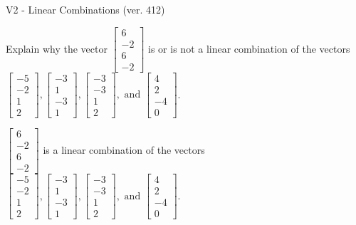 \begin{exercise}
  \begin{exerciseTitle}V2 - Linear Combinations (ver. 412)\end{exerciseTitle}
  \begin{exerciseStatement}
    Explain why the vector \(\left[\begin{array}{c}
6 \\
-2 \\
6 \\
-2
\end{array}\right]\)  is or is not a linear 
	combination of the vectors \(\left[\begin{array}{c}
-5 \\
-2 \\
1 \\
2
\end{array}\right] , \left[\begin{array}{c}
-3 \\
1 \\
-3 \\
1
\end{array}\right] , \left[\begin{array}{c}
-3 \\
-3 \\
1 \\
2
\end{array}\right] , \text{ and } \left[\begin{array}{c}
4 \\
2 \\
-4 \\
0
\end{array}\right]\).
	


  \end{exerciseStatement}
  \begin{exerciseAnswer}
   \(\left[\begin{array}{c}
6 \\
-2 \\
6 \\
-2
\end{array}\right]\) 
  	 is  
	a linear combination of the vectors \(\left[\begin{array}{c}
-5 \\
-2 \\
1 \\
2
\end{array}\right] , \left[\begin{array}{c}
-3 \\
1 \\
-3 \\
1
\end{array}\right] , \left[\begin{array}{c}
-3 \\
-3 \\
1 \\
2
\end{array}\right] , \text{ and } \left[\begin{array}{c}
4 \\
2 \\
-4 \\
0
\end{array}\right]\).


\end{exerciseAnswer}
\end{exercise}

